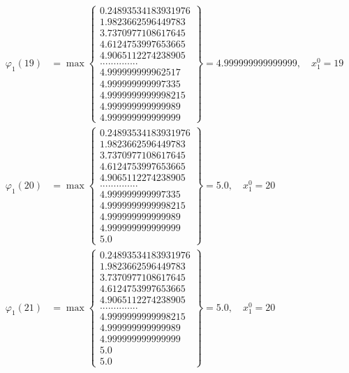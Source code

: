 \documentclass{article}
\begin{document}
\begin{align*}
  
  
  
\varphi_{1}(19) &= \max \left\{ \begin{array}{c}
0.24893534183931976 \\
 1.9823662596449783 \\
 3.7370977108617645 \\
 4.6124753997653665 \\
 4.9065112274238905 \\
 .............. \\
 4.999999999962517 \\
 4.999999999997335 \\
 4.9999999999998215 \\
 4.999999999999989 \\
 4.999999999999999
\end{array} \right\} = 4.999999999999999, \quad x_{1}^0 = 19\\
  
  
  
  
\varphi_{1}(20) &= \max \left\{ \begin{array}{c}
0.24893534183931976 \\
 1.9823662596449783 \\
 3.7370977108617645 \\
 4.6124753997653665 \\
 4.9065112274238905 \\
 .............. \\
 4.999999999997335 \\
 4.9999999999998215 \\
 4.999999999999989 \\
 4.999999999999999 \\
 5.0
\end{array} \right\} = 5.0, \quad x_{1}^0 = 20\\
  
  
  
  
\varphi_{1}(21) &= \max \left\{ \begin{array}{c}
0.24893534183931976 \\
 1.9823662596449783 \\
 3.7370977108617645 \\
 4.6124753997653665 \\
 4.9065112274238905 \\
 .............. \\
 4.9999999999998215 \\
 4.999999999999989 \\
 4.999999999999999 \\
 5.0 \\
 5.0
\end{array} \right\} = 5.0, \quad x_{1}^0 = 20\\
  

\end{align*}
\end{document}
